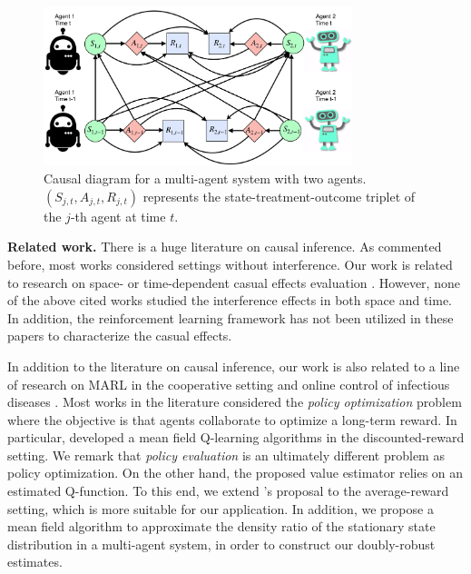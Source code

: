 \documentclass{article}
\begin{document}
\begin{figure}[!t]
	\centering
	\includegraphics[width=9cm]{CausalDiagram.png}
	\vspace{-0.3cm}
	\caption{\small Causal diagram for a multi-agent system with two agents. $(S_{j,t},A_{j,t},R_{j,t})$ represents the state-treatment-outcome triplet of the $j$-th agent at time $t$.}\label{fig1}
\end{figure}

\textbf{Related work.} There is a huge literature on causal inference. As commented before, most works considered settings without interference. Our work is related to research on space- or time-dependent casual effects evaluation \citep[see e.g.,][]{Hudgens2008,Eric2012,toulis2013estimation,dempsey2017stratified,Athey2018,Murphy2018,bhattacharya2019causal,Bojinov2019,ning2019Bayes}. However, none of the above cited works studied the interference effects in both space and time. In addition, the reinforcement learning framework has not been utilized in these papers to characterize the casual effects. 

In addition to the literature on causal inference, our work is also related to a line of research on MARL in the cooperative setting \citep[see e.g.,][for an overview]{zhang2019multi} and online control of infectious diseases \citep[see e.g.,][]{Laber2018}. Most works in the literature considered the \textit{policy optimization} problem where the objective is that agents collaborate to optimize a long-term reward. In particular, \cite{yang2018mean} developed a mean field Q-learning algorithms in the discounted-reward setting. %
We remark that {\textit{policy evaluation}} is an ultimately different problem as policy optimization. On the other hand, the proposed value estimator relies on an estimated Q-function. To this end, we extend \cite{yang2018mean}'s proposal to the average-reward setting, which is more suitable for our application. In addition, we propose a mean field algorithm to approximate the density ratio of the stationary state distribution in a multi-agent system, in order to construct our doubly-robust estimates.
\end{document}
